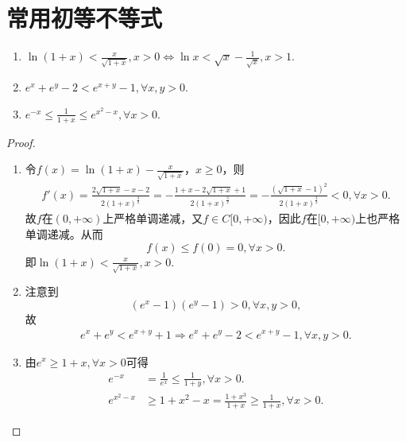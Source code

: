 \documentclass[../../main.tex]{subfiles}%
\begin{document}
\section{常用初等不等式}

\begin{proposition}[指数/对数函数不等式]\label{proposition:指数对数函数不等式}
\begin{enumerate}[(1)]
\item\label{proposition:指数对数函数不等式1} $\ln \left( 1+x \right) <\frac{x}{\sqrt{1+x}},x>0\iff \ln x<\sqrt{x}-\frac{1}{\sqrt{x}},x>1.$

\item \label{proposition:指数对数函数不等式3} $e^x+e^y-2<e^{x+y}-1,\forall x,y>0.$

\item \label{proposition:指数对数函数不等式4} $e^{-x}\leqslant \frac{1}{1+x}\leqslant e^{x^2-x},\forall x>0.$
\end{enumerate}
\end{proposition}
\begin{proof}
\begin{enumerate}[(1)]
\item 令\(f(x)=\ln(1 + x)-\frac{x}{\sqrt{1 + x}}\)，\(x\geqslant 0\)，则
\begin{align*}
f'\left( x \right) =\frac{2\sqrt{1+x}-x-2}{2\left( 1+x \right) ^{\frac{3}{2}}}=-\frac{1+x-2\sqrt{1+x}+1}{2\left( 1+x \right) ^{\frac{3}{2}}}=-\frac{\left( \sqrt{1+x}-1 \right) ^2}{2\left( 1+x \right) ^{\frac{3}{2}}}<0,\forall x>0.
\end{align*}
故\(f\)在\((0,+\infty)\)上严格单调递减，又\(f\in C[0,+\infty)\)，因此\(f\)在\([0,+\infty)\)上也严格单调递减。从而
\[
f(x)\leqslant f(0)=0,\forall x>0.
\]
即\(\ln(1 + x)<\frac{x}{\sqrt{1 + x}},x>0\).

\item 注意到
\[
(e^x-1)(e^y-1)>0,\forall x,y>0,
\]
故
\begin{align*}
e^x+e^y<e^{x+y}+1\Longrightarrow e^x+e^y-2<e^{x+y}-1,\forall x,y>0.
\end{align*}

\item 由$e^x\geqslant 1+x,\forall x>0$可得
\begin{align*}
e^{-x}&=\frac{1}{e^x}\leqslant \frac{1}{1+y},\forall x>0.
\\
e^{x^2-x}&\geqslant 1+x^2-x=\frac{1+x^3}{1+x}\geqslant \frac{1}{1+x},\forall x>0.
\end{align*}
\end{enumerate}

\end{proof}
\end{document}
